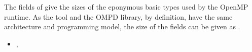 \descr
The fields of  give the sizes of
the eponymous basic types used by the OpenMP runtime.
As the tool and the OMPD library, by definition, have the same
architecture and programming model, the size of the fields can be given
as .

\crossreferences
\begin{itemize}
	\item
	, 
\end{itemize}
